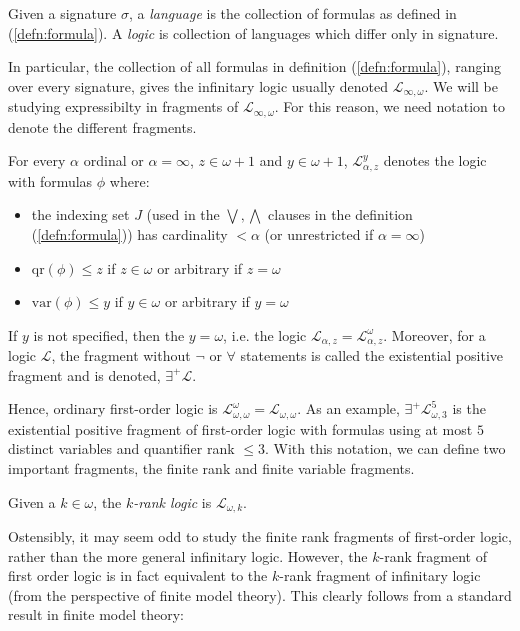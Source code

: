 \begin{defn}
Given a signature $\sigma$, a \textit{language} is the collection of formulas as defined in (\ref{defn:formula}). A \textit{logic} is collection of languages which differ only in signature. 
\end{defn}
In particular, the collection of all formulas in definition (\ref{defn:formula}), ranging over every signature, gives the infinitary logic usually denoted $\mathcal{L}_{\infty,\omega}$. We will be studying expressibilty in fragments of $\mathcal{L}_{\infty,\omega}$. For this reason, we need notation to denote the different fragments.
\begin{defn}
For every $\alpha$ ordinal or $\alpha = \infty$, $z \in \omega+1$ and $y \in \omega+1$, $\mathcal{L}^{y}_{\alpha,z}$ denotes the logic with formulas $\phi$ where:
\begin{itemize}
    \item the indexing set $J$ (used in the $\bigvee, \bigwedge$ clauses in the definition (\ref{defn:formula})) has cardinality $< \alpha$ (or unrestricted if $\alpha = \infty$)
    \item $\text{qr}(\phi) \leq z$ if $z \in \omega$ or arbitrary if $z = \omega$
    \item $\text{var}(\phi) \leq y$ if $y \in \omega$ or arbitrary if $y = \omega$
\end{itemize}
If $y$ is not specified, then the $y = \omega$, i.e. the logic $\mathcal{L}_{\alpha,z} = \mathcal{L}^{\omega}_{\alpha,z}$. Moreover, for a logic $\mathcal{L}$, the fragment without $\neg$ or $\forall$ statements is called the existential positive fragment and is denoted, $\exists^{+}\mathcal{L}$.
\end{defn}
Hence, ordinary first-order logic is $\mathcal{L}^{\omega}_{\omega,\omega} = \mathcal{L}_{\omega,\omega}$. As an example, $\exists^{+}\mathcal{L}^{5}_{\omega,3}$ is the existential positive fragment of first-order logic with formulas using at most $5$ distinct variables and quantifier rank $\leq 3$. With this notation, we can define two important fragments, the finite rank and finite variable fragments. 
\begin{defn}
Given a $k \in \omega$, the \textit{$k$-rank logic} is $\mathcal{L}_{\omega,k}$. 
\end{defn}
Ostensibly, it may seem odd to study the finite rank fragments of first-order logic, rather than the more general infinitary logic. However, the $k$-rank fragment of first order logic is in fact equivalent to the $k$-rank fragment of infinitary logic (from the perspective of finite model theory). This clearly follows from a standard result in finite model theory:
